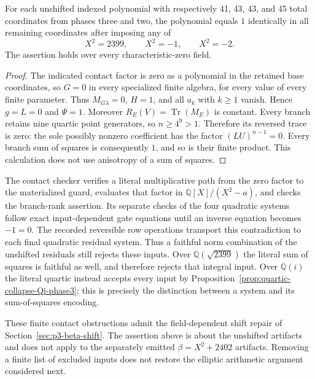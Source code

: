 \begin{proposition}\label{prop:indexed-contact-value-one-phase3}
For each unshifted indexed polynomial with respectively
41, 43, 43, and 45 total coordinates from phases three and two,
the polynomial equals $1$ identically in all remaining
coordinates after imposing any of
\[
                         X^2=2399,\qquad X^2=-1,
                              \qquad X^2=-2.
\]
The assertion holds over every characteristic-zero field.
\end{proposition}
\begin{proof}
The indicated contact factor is zero as a polynomial in the
retained base coordinates, so $G=0$ in every specialized
finite algebra, for every value of every finite parameter.
Thus $M_{G\lambda}=0$, $H=1$, and all $a_k$ with $k\ge1$
vanish.  Hence $g=L=0$ and $\Psi=1$.
Moreover $R_E(V)=\operatorname{Tr}(M_E)$ is constant.
Every branch retains nine quartic point generators, so
$n\ge4^9>1$.  Therefore its reversed trace is zero:
the sole possibly nonzero coefficient has the factor
$(LU)^{n-1}=0$.  Every branch sum of squares is consequently
$1$, and so is their finite product.  This calculation does
not use anisotropy of a sum of squares.
\end{proof}

The contact checker verifies a literal multiplicative path from
the zero factor to the materialized guard, evaluates that factor
in $\mathbb Q[X]/(X^2-a)$, and checks the branch-rank assertion.
Its separate checks of the four quadratic systems follow exact
input-dependent gate equations until an inverse equation becomes
$-1=0$.  The recorded reversible row operations transport this
contradiction to each final quadratic residual system.  Thus a
faithful norm combination of the unshifted residuals still rejects
these inputs.  Over $\mathbb Q(\sqrt{2399})$ the literal sum of
squares is faithful as well, and therefore rejects that integral
input.  Over $\mathbb Q(i)$ the literal quartic instead accepts
every input by Proposition~\ref{prop:quartic-collapse-Qi-phase3};
this is precisely the distinction between a system and its
sum-of-squares encoding.

These finite contact obstructions admit the field-dependent shift
repair of Section~\ref{sec:p3-beta-shift}.  The assertion above
is about the unshifted artifacts and does not apply to the
separately emitted $\beta=X^2+2402$ artifacts.  Removing a finite
list of excluded inputs does not restore the elliptic arithmetic
argument considered next.

